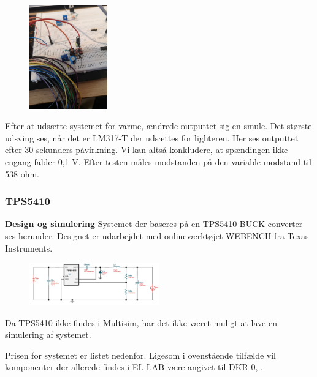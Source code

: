 \begin{figure}[h]
  \centering
  \includegraphics[width=0.3\textwidth]{bil6.jpg}
  \caption{}
  \label{fig:bil6}
\end{figure}

Efter at udsætte systemet for varme, ændrede outputtet sig en smule. Det største udsving ses, når det er LM317-T der udsættes for lighteren. Her ses outputtet efter 30 sekunders påvirkning. Vi kan altså konkludere, at spændingen ikke engang falder 0,1 V.
Efter testen måles modstanden på den variable modstand til 538 ohm.

\subsubsection{TPS5410}
\label{sec:tps5410}

\textbf{Design og simulering}\newline
Systemet der baseres på en TPS5410 BUCK-converter ses herunder. Designet er udarbejdet med onlineværktøjet WEBENCH fra Texas Instruments. 

\begin{figure}[h]
  \centering
  \includegraphics[width=0.5\textwidth]{dia2.png}
  \caption{}
  \label{fig:bil6}
\end{figure}

Da TPS5410 ikke findes i Multisim, har det ikke været muligt at lave en simulering af systemet.


Prisen for systemet er listet nedenfor. Ligesom i ovenstående tilfælde vil komponenter der allerede findes i EL-LAB være angivet til DKR 0,-.

